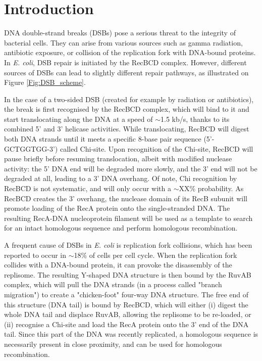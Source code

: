 \section*{Introduction}

DNA double-strand breaks (DSBs) pose a serious threat to the integrity of bacterial cells. They can arise from various sources such as gamma radiation, antibiotic exposure, or collision of the replication fork with DNA-bound proteins. In \emph{E. coli}, DSB repair is initiated by the RecBCD complex. However, different sources of DSBs can lead to slightly different repair pathways, as illustrated on Figure \ref{Fig:DSB_scheme}.

In the case of a two-sided DSB (created for example by radiation or antibiotics), the break is first recognised by the RecBCD complex, which will bind to it and start translocating along the DNA at a speed of $\sim$1.5 kb/s, thanks to its combined 5' and 3' helicase activities. While translocating, RecBCD will digest both DNA strands until it meets a specific 8-base pair sequence (5'-GCTGGTGG-3') called Chi-site. Upon recognition of the Chi-site, RecBCD will pause briefly before resuming translocation, albeit with modified nuclease activity: the 5' DNA end will be degraded more slowly, and the 3' end will not be degraded at all, leading to a 3' DNA overhang. Of note, Chi recognition by RecBCD is not systematic, and will only occur with a $\sim$XX\% probability. As RecBCD creates the 3' overhang, the nuclease domain of its RecB subunit will promote loading of the RecA protein onto the single-stranded DNA. The resulting RecA-DNA nucleoprotein filament will be used as a template to search for an intact homologous sequence and perform homologous recombination.

A frequent cause of DSBs in \emph{E. coli} is replication fork collisions, which has been reported to occur in $\sim$18\% of cells per cell cycle.\cite{Sinha2018} When the replication fork collides with a DNA-bound protein, it can provoke the disassembly of the replisome. The resulting Y-shaped DNA structure is then bound by the RuvAB complex, which will pull the DNA strands (in a process called "branch migration") to create a "chicken-foot" four-way DNA structure. The free end of this structure (DNA tail) is bound by RecBCD, which will either (i) digest the whole DNA tail and displace RuvAB, allowing the replisome to be re-loaded, or (ii) recognise a Chi-site and load the RecA protein onto the 3' end of the DNA tail. Since this part of the DNA was recently replicated, a homologous sequence is necessarily present in close proximity, and can be used for homologous recombination.

